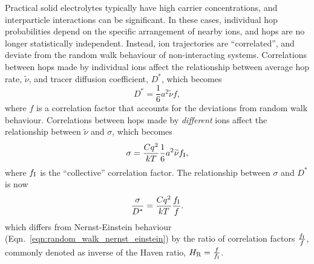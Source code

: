 \documentclass[aps,prb,twocolumn,superscriptaddress,reprint]{revtex4-1}
\newcommand{\hrpa}{{\widetilde{\nu}}}
\begin{document}
Practical solid electrolytes typically have high carrier concentrations, and interparticle interactions can be significant. 
In these cases, individual hop probabilities depend on the specific arrangement of nearby ions, and hops are no longer statistically independent. 
Instead, ion trajectories are ``correlated'', and deviate from the random walk behaviour of non-interacting systems.\cite{BardeenAndHerring_Imperfections1952, CompaanAndHaven_TransFaradaySoc1958, AllnattAndLidiard_AtomicTransportInSolids,HowardAndLidiard_RepProgPhys1964} Correlations between hops made by individual ions affect the relationship between average hop rate, $\hrpa$, and tracer diffusion coefficient, $D^*$, which becomes
\begin{equation}
  D^* = \frac{1}{6}a^2\hrpa f,
  \label{eqn:correlated_diffusion}
\end{equation}
where $f$ is a correlation factor that accounts for the deviations from random walk behaviour. 
Correlations between hops made by \emph{different} ions affect the relationship between $\hrpa$ and $\sigma$, which becomes
\begin{equation}
  \sigma = \frac{Cq^2}{kT}\frac{1}{6}a^2\hrpa f_\m{I},
  \label{eqn:correlated_conductivity}
\end{equation}
where $f_{\mathrm{I}}$ is the ``collective'' correlation factor. 
The relationship between $\sigma$ and $D^*$ is now 
\begin{equation}
  \frac{\sigma}{D^*} = \frac{Cq^2}{kT}\frac{f_{\mathrm{I}}}{f}.
  \label{eqn:correlated_nernst_einstein}
\end{equation}
which differs from Nernst-Einstein behaviour (Eqn.\ \ref{eqn:random_walk_nernst_einstein}) by the ratio of correlation factors $\frac{f_{\mathrm{I}}}{f}$, commonly denoted as inverse of the Haven ratio, $H_{\mathrm{R}}=\frac{f}{f_{\mathrm{I}}}$.\cite{Murch_SolStatIonics1982,Akbar_JApplPhys1994}
\end{document}
